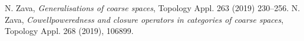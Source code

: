 \documentclass[12pt]{article}
\theoremstyle{definition}
\numberwithin{equation}{section}
\begin{document}
\begin{thebibliography}{999}
{%




%
%
%




%
%
%
 N. Zava, {\em Generalisations of coarse spaces}, Topology Appl. 263 (2019) 230--256.
 N. Zava, {\em Cowellpoweredness and closure operators in categories of coarse spaces}, Topology Appl. 268 (2019), 106899.




}

\end{thebibliography}   
\end{document}
